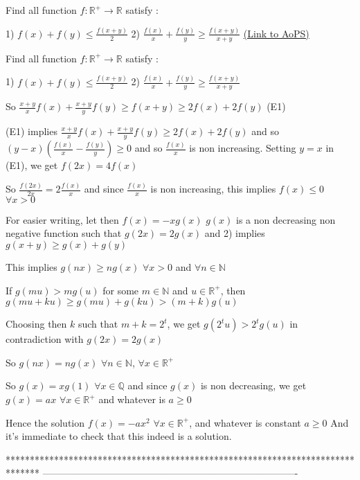 \begin{problem}
	Find all function $f : \mathbb{R^+} \to \mathbb{R}$ satisfy :

1) $ f(x)+f(y) \leq \frac {f(x+y)}{2} $
2) $ \frac {f(x)}{x} + \frac {f(y)}{y} \ge \frac {f(x+y)}{x+y} $
	\flushright \href{https://artofproblemsolving.com/community/c6h536599}{(Link to AoPS)}
\end{problem}



\begin{solution}
	\begin{tcolorbox}Find all function $f : \mathbb{R^+} \to \mathbb{R}$ satisfy :

1) $ f(x)+f(y) \leq \frac {f(x+y)}{2} $
2) $ \frac {f(x)}{x} + \frac {f(y)}{y} \ge \frac {f(x+y)}{x+y} $\end{tcolorbox}
So $\frac{x+y}xf(x)+\frac{x+y}yf(y)\ge f(x+y)\ge 2f(x)+2f(y)$ (E1)

(E1) implies $\frac{x+y}xf(x)+\frac{x+y}yf(y)\ge 2f(x)+2f(y)$ and so $(y-x)(\frac{f(x)}x-\frac{f(y)}y)\ge 0$ and so $\frac{f(x)}x$ is non increasing.
Setting $y=x$ in (E1), we get $f(2x)=4f(x)$

So $\frac{f(2x)}{2x}=2\frac{f(x)}x$ and since $\frac{f(x)}x$ is non increasing, this implies $f(x)\le 0$ $\forall x>0$

For easier writing, let then $f(x)=-xg(x)$
$g(x)$ is a non decreasing non negative function such that $g(2x)=2g(x)$ and 2) implies $g(x+y)\ge g(x)+g(y)$

This implies $g(nx)\ge ng(x)$ $\forall x>0$ and $\forall n\in\mathbb N$

If $g(mu)>mg(u)$ for some $m\in\mathbb N$ and $u\in\mathbb R^+$, then $g(mu+ku)\ge g(mu)+g(ku)>(m+k)g(u)$

Choosing then $k$ such that $m+k=2^t$, we get $g(2^tu)>2^tg(u)$ in contradiction with $g(2x)=2g(x)$

So $g(nx)=ng(x)$ $\forall n\in\mathbb N$, $\forall x\in\mathbb R^+$

So $g(x)=xg(1)$ $\forall x\in\mathbb Q$ and since $g(x)$ is non decreasing, we get $g(x)=ax$ $\forall x\in\mathbb R^+$ and whatever is $a\ge 0$

Hence the solution $\boxed{f(x)=-ax^2}$ $\forall x\in\mathbb R^+$, and whatever is constant $a\ge 0$
And it's immediate to check that this indeed is a solution.
\end{solution}
*******************************************************************************
-------------------------------------------------------------------------------

